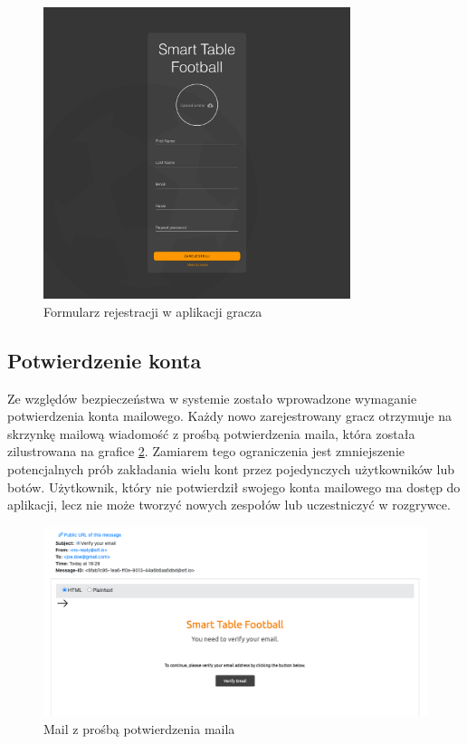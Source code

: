 \begin{figure}[h!]
  \centering
    \includegraphics[width=0.8\textwidth]{images/player/registration.png}
  \caption{Formularz rejestracji w aplikacji gracza}
  \label{fig:player-registration}
\end{figure}

\subsection{Potwierdzenie konta}

Ze względów bezpieczeństwa w systemie zostało wprowadzone wymaganie potwierdzenia konta mailowego. Każdy nowo zarejestrowany gracz otrzymuje na skrzynkę mailową wiadomość z prośbą potwierdzenia maila, która została zilustrowana na grafice \ref{fig:verifyEmail}. Zamiarem tego ograniczenia jest zmniejszenie potencjalnych prób zakładania wielu kont przez pojedynczych użytkowników lub botów. Użytkownik, który nie potwierdził swojego konta mailowego ma dostęp do aplikacji, lecz nie może tworzyć nowych zespołów lub uczestniczyć w rozgrywce.

\begin{figure}[h!]
  \centering
    \includegraphics[width=\textwidth]{images/api/verify_email.png}
  \caption{Mail z prośbą potwierdzenia maila}
  \label{fig:verifyEmail}
\end{figure}

